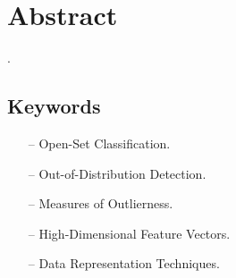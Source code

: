 
\chapter*{Abstract}
\label{chapter:abstract}

.


\section*{Keywords}
\label{section:keywords}

\begin{itemize}
    \item[–] Open-Set Classification.
    \item[–] Out-of-Distribution Detection.
    \item[–] Measures of Outlierness.
    \item[–] High-Dimensional Feature Vectors.
    \item[–] Data Representation Techniques.
\end{itemize}
